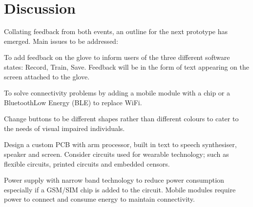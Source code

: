 \section{Discussion}

Collating feedback from both events, an outline for the next prototype has emerged.  Main issues to be addressed:

To add feedback on the glove to inform users of the three different software states: Record, Train, Save.  Feedback will be in the form of text appearing on the screen attached to the glove. 

To solve connectivity problems by adding a mobile module with a chip or a Bluetooth\texttrademark Low Energy (BLE) to replace WiFi\texttrademark. 

Change buttons to be different shapes rather than different colours to cater to the needs of visual impaired individuals.

Design a custom PCB with arm processor, built in text to speech synthesiser, speaker and screen. Consider circuits used for wearable technology; such as flexible circuits, printed circuits and embedded censors. 

Power supply with narrow band technology to reduce power consumption especially if a GSM/SIM chip is added to the circuit.  Mobile modules require power to connect and consume energy to maintain connectivity.  








